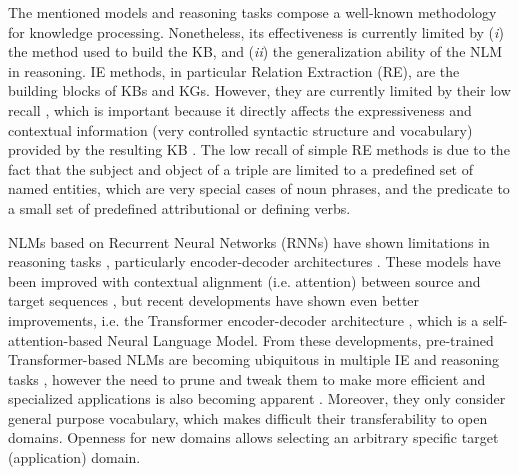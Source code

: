 \documentclass[preprint]{elsarticle}
\begin{document}
The mentioned models and reasoning tasks compose a well-known methodology for knowledge processing. Nonetheless, its effectiveness is currently limited by (\textit{i}) the method used to build the KB, and (\textit{ii}) the generalization ability of the NLM in reasoning. IE methods, in particular Relation Extraction (RE), are the building blocks of KBs and KGs. However, they are currently limited by their low recall \cite{xu-etal-2013-open}, which is important because it directly affects the expressiveness and contextual information (very controlled syntactic structure and vocabulary) provided by the resulting KB \cite{cetto-etal-2018-graphene-context,shin2015incremental,popescul2003statistical,koller2007introduction,getoor2011learning}. The low recall of simple RE methods is due to the fact that the subject and object of a triple are limited to a predefined set of named entities, which are very special cases of noun phrases, and the predicate to a small set of predefined attributional or defining verbs.

NLMs based on Recurrent Neural Networks (RNNs) have shown limitations in reasoning tasks \cite{hochreiter1997long,zhou2015end}, particularly encoder-decoder architectures \cite{cho2014learning,chaudhari2021attentive}. These models have been improved with contextual alignment (i.e. attention) between source and target sequences \cite{bahdanau2015neural,luong-etal-2015-effective}, but recent developments have shown even better improvements, i.e. the Transformer encoder-decoder architecture \cite{vaswani2017attention}, which is a self-attention-based Neural Language Model. From these developments, pre-trained Transformer-based NLMs are becoming ubiquitous in multiple IE and reasoning tasks \cite{kenton2019bert,yang2019xlnet,floridi2020gpt}, however the need to prune and tweak them to make more efficient and specialized applications is also becoming apparent \cite{han-etal-2021-robust,lee2020biobert,meng2021mixture,pfeiffer2020adapterhub}. Moreover, they only consider general purpose vocabulary, which makes difficult their transferability to open domains. Openness for new domains allows selecting an arbitrary specific target (application) domain.
\end{document}
